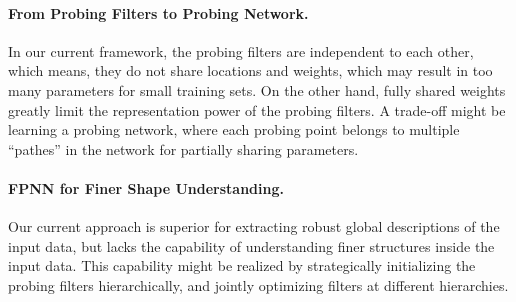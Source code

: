 \paragraph{From Probing Filters to Probing Network.}
In our current framework, the probing filters are independent to each other, which means, they do not share locations and weights, which may result in too many parameters for small training sets. On the other hand, fully shared weights greatly limit the representation power of the probing filters. A trade-off might be learning a probing network, where each probing point belongs to multiple ``pathes'' in the network for partially sharing parameters.

\paragraph{FPNN for Finer Shape Understanding.}
Our current approach is superior for extracting robust global descriptions of the input data, but lacks the capability of understanding finer structures inside the input data. This capability might be realized by strategically initializing the probing filters hierarchically, and jointly optimizing filters at different hierarchies.
